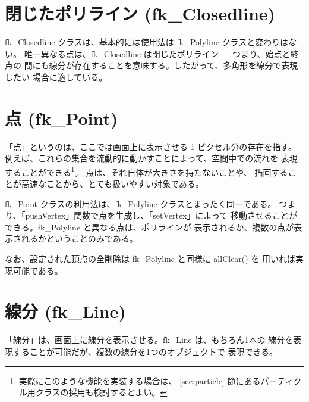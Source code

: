 \section{閉じたポリライン (fk\_Closedline)}
fk\_Closedline クラスは、基本的には使用法は fk\_Polyline クラスと変わりはない。
唯一異なる点は、fk\_Closedline は閉じたポリライン --- つまり、始点と終点の
間にも線分が存在することを意味する。したがって、多角形を線分で表現したい
場合に適している。
\section{点 (fk\_Point)}
「点」というのは、ここでは画面上に表示させる 1 ピクセル分の存在を指す。
例えば、これらの集合を流動的に動かすことによって、空間中での流れを
表現することができる\footnote{実際にこのような機能を実装する場合は、
\ref{sec:particle} 節にあるパーティクル用クラスの採用も検討するとよい。}。
点は、それ自体が大きさを持たないことや、
描画することが高速なことから、とても扱いやすい対象である。

fk\_Point クラスの利用法は、fk\_Polyline クラスとまったく同一である。
つまり、「pushVertex」関数で点を生成し、「setVertex」によって
移動させることができる。fk\_Polyline と異なる点は、ポリラインが
表示されるか、複数の点が表示されるかということのみである。

なお、設定された頂点の全削除は fk\_Polyline と同様に allClear() を
用いれば実現可能である。
\section{線分 (fk\_Line)}
「線分」は、画面上に線分を表示させる。fk\_Line は、もちろん1本の
線分を表現することが可能だが、複数の線分を1つのオブジェクトで
表現できる。

